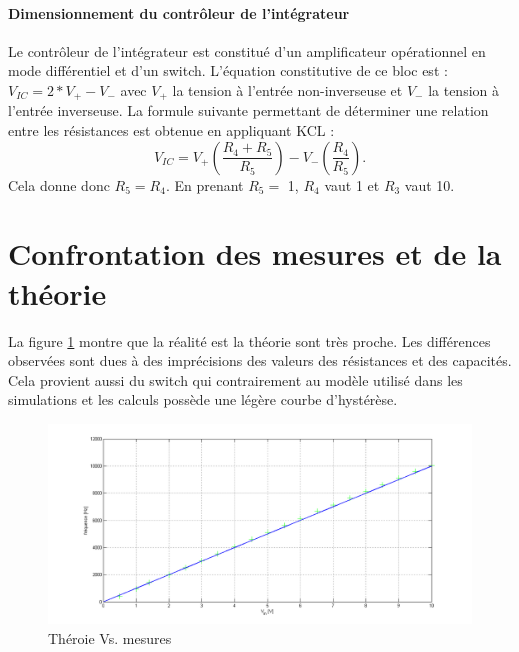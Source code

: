 \paragraph{Dimensionnement du contrôleur de l'intégrateur}
Le contrôleur de l'intégrateur est constitué d'un amplificateur opérationnel 
en mode différentiel et d'un switch. L'équation constitutive de ce bloc est : 
$V_{IC}=2*V_+ - V_-$ avec $V_+$ la tension à l'entrée non-inverseuse et $V_-$
la tension à l'entrée inverseuse. La formule suivante permettant de déterminer
une relation entre les résistances est obtenue en appliquant KCL : 
\[ V_{IC}=V_+ \left(\frac{R_4 + R_5}{R_5}\right)-V_-\left(\frac{R_4}{R_5}\right). \] 
Cela donne donc $R_5 = R_4$. En prenant $R_5 =$ \unit{1}{\kilo\ohm}, $R_4$ vaut \unit{1}{\kilo\ohm}
et $R_3$ vaut \unit{10}{\kilo\ohm}.

\section{Confrontation  des mesures et de la théorie}
%

La figure \ref{fig:theory_vs_mesure} montre que la réalité est la théorie sont très proche.
Les différences observées sont dues à des imprécisions des valeurs des résistances et des 
capacités. Cela provient aussi du switch qui contrairement au modèle utilisé dans les 
simulations et les calculs possède une légère courbe d'hystérèse.
\begin{figure}
	\centering
	\includegraphics[scale=0.45]{img-vco/vco_vs_reality.png}
	\caption{ Théroie Vs. mesures}
	\label{fig:theory_vs_mesure}
\end{figure}

